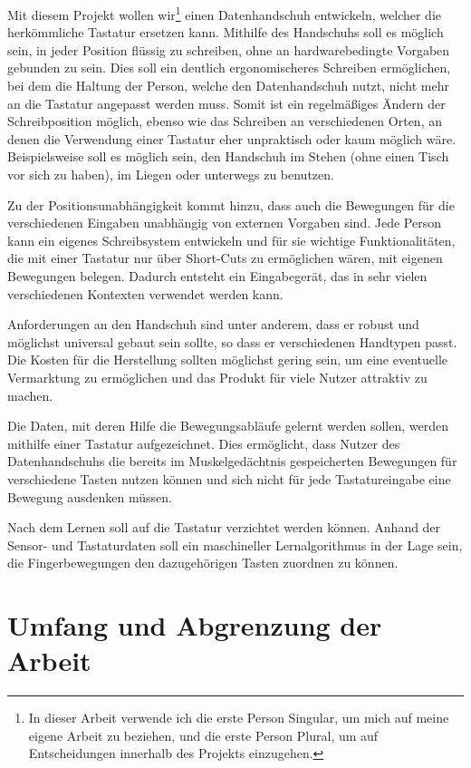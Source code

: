 Mit diesem Projekt wollen wir\footnote{In dieser Arbeit verwende ich die erste Person Singular, um mich auf meine eigene Arbeit zu beziehen, und die erste Person Plural, um auf Entscheidungen innerhalb des Projekts einzugehen.} einen Datenhandschuh entwickeln, welcher die herkömmliche Tastatur ersetzen kann. Mithilfe des Handschuhs soll es möglich sein, in jeder Position flüssig zu schreiben, ohne an hardwarebedingte Vorgaben gebunden zu sein. Dies soll ein deutlich ergonomischeres Schreiben ermöglichen, bei dem die Haltung der Person, welche den Datenhandschuh nutzt, nicht mehr an die Tastatur angepasst werden muss. Somit ist ein regelmäßiges Ändern der Schreibposition möglich, ebenso wie das Schreiben an verschiedenen Orten, an denen die Verwendung einer Tastatur eher unpraktisch oder kaum möglich wäre. Beispielsweise soll es möglich sein, den Handschuh im Stehen (ohne einen Tisch vor sich zu haben), im Liegen oder unterwegs zu benutzen.

Zu der Positionsunabhängigkeit kommt hinzu, dass auch die Bewegungen für die verschiedenen Eingaben unabhängig von externen Vorgaben sind. Jede Person kann ein eigenes Schreibsystem entwickeln und für sie wichtige Funktionalitäten, die mit einer Tastatur nur über Short-Cuts zu ermöglichen wären, mit eigenen Bewegungen belegen. Dadurch entsteht ein Eingabegerät, das in sehr vielen verschiedenen Kontexten verwendet werden kann.

Anforderungen an den Handschuh sind unter anderem, dass er robust und möglichst universal gebaut sein sollte, so dass er verschiedenen Hand\-typen passt. Die Kosten für die Herstellung sollten möglichst gering sein, um eine eventuelle Vermarktung zu ermöglichen und das Produkt für viele Nutzer attraktiv zu machen.

Die Daten, mit deren Hilfe die Bewegungsabläufe gelernt werden sollen, werden mithilfe einer Tastatur aufgezeichnet. Dies ermöglicht, dass Nutzer des Datenhandschuhs die bereits im Muskelgedächtnis gespeicherten Bewegungen für verschiedene Tasten nutzen können und sich nicht für jede Tastatureingabe eine Bewegung ausdenken müssen.

Nach dem Lernen soll auf die Tastatur verzichtet werden können. Anhand der Sensor- und Tastaturdaten soll ein maschineller Lernalgorithmus in der Lage sein, die Fingerbewegungen den dazugehörigen Tasten zuordnen zu können.

\section{Umfang und Abgrenzung der Arbeit}

